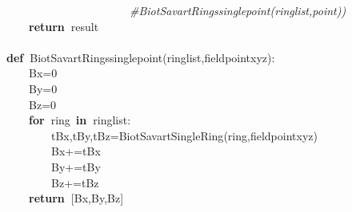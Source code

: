 \documentclass{article}
\newcommand{\hlstd}[1]{\textcolor[rgb]{0,0,0}{#1}}
\newcommand{\hlnum}[1]{\textcolor[rgb]{0.16,0.16,1}{#1}}
\newcommand{\hlslc}[1]{\textcolor[rgb]{0.51,0.51,0.51}{\it{#1}}}
\newcommand{\hlsym}[1]{\textcolor[rgb]{0,0,0}{#1}}
\newcommand{\hlkwa}[1]{\textcolor[rgb]{0,0,0}{\bf{#1}}}
\newcommand{\hlkwd}[1]{\textcolor[rgb]{0,0,0.51}{#1}}
\begin{document}
\hlstd{}\hlstd{\ \ \ \ \ \ \ \ \ \ \ \ \ \ \ \ \ \ \ \ \ \ }\hlstd{}\hlslc{\#\textunderscore Biot\textunderscore Savart\textunderscore Rings\textunderscore singlepoint(ringlist,point))}\hspace*{\fill}\\
\hlstd{}\hlstd{\ \ \ \ }\hlstd{}\hlkwa{return\ }\hlstd{result}\hspace*{\fill}\\
\hspace*{\fill}\\
\hlkwa{def\ }\hlstd{}\hlkwd{\textunderscore Biot\textunderscore Savart\textunderscore Rings\textunderscore singlepoint}\hlstd{}\hlsym{(}\hlstd{ringlist}\hlsym{,}\hlstd{fieldpoint\textunderscore xyz}\hlsym{):}\hspace*{\fill}\\
\hlstd{}\hlstd{\ \ \ \ }\hlstd{Bx}\hlsym{=}\hlstd{}\hlnum{0}\hspace*{\fill}\\
\hlstd{}\hlstd{\ \ \ \ }\hlstd{By}\hlsym{=}\hlstd{}\hlnum{0}\hspace*{\fill}\\
\hlstd{}\hlstd{\ \ \ \ }\hlstd{Bz}\hlsym{=}\hlstd{}\hlnum{0}\hspace*{\fill}\\
\hlstd{}\hlstd{\ \ \ \ }\hlstd{}\hlkwa{for\ }\hlstd{ring\ }\hlkwa{in\ }\hlstd{ringlist}\hlsym{:}\hspace*{\fill}\\
\hlstd{}\hlstd{\ \ \ \ \ \ \ \ }\hlstd{tBx}\hlsym{,}\hlstd{tBy}\hlsym{,}\hlstd{tBz}\hlsym{=}\hlstd{}\hlkwd{\textunderscore Biot\textunderscore Savart\textunderscore SingleRing}\hlstd{}\hlsym{(}\hlstd{ring}\hlsym{,}\hlstd{fieldpoint\textunderscore xyz}\hlsym{)}\hspace*{\fill}\\
\hlstd{}\hlstd{\ \ \ \ \ \ \ \ }\hlstd{Bx}\hlsym{+=}\hlstd{tBx\hspace*{\fill}\\
}\hlstd{\ \ \ \ \ \ \ \ }\hlstd{By}\hlsym{+=}\hlstd{tBy\hspace*{\fill}\\
}\hlstd{\ \ \ \ \ \ \ \ }\hlstd{Bz}\hlsym{+=}\hlstd{tBz\hspace*{\fill}\\
}\hlstd{\ \ \ \ }\hlstd{}\hlkwa{return\ }\hlstd{}\hlsym{{[}}\hlstd{Bx}\hlsym{,}\hlstd{By}\hlsym{,}\hlstd{Bz}\hlsym{{]}}\hspace*{\fill}\\
\hlstd{}\hspace*{\fill}\\
\end{document}

